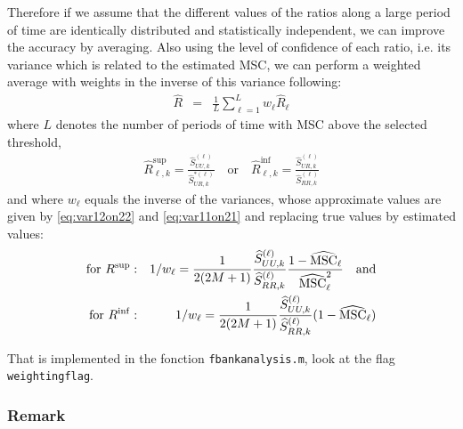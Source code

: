 Therefore if we assume that the different values of the ratios along a large period of time are identically distributed and statistically independent, we can improve the accuracy by averaging. Also using the level of confidence of each ratio, i.e. its variance which is related to the  estimated MSC, we can perform a weighted average with weights in the inverse of this variance following:
\begin{eqnarray}
\label{eq:weithted-average-Ratio}
 \hat R &=& \frac{1}{L}\sum_{\ell=1}^{L}w_{\ell}\hat R_{\ell}
\end{eqnarray}
where $L$ denotes the number of periods of time with MSC above the selected threshold,
\begin{eqnarray}
\label{eq:estimated-Ratio}
\hat R_{\ell,k} ^{\sup}=\frac{\hat S_{UU,k}^{(\ell)}}{\hat S^{*(\ell)}_{UR,k}}
\quad
\mathrm{or}
\quad
\hat R_{\ell,k}^{\inf} =\frac{\hat S_{UR,k}^{(\ell)}}{\hat S_{RR,k}^{(\ell)}}
\end{eqnarray}
and where $w_{\ell}$ equals the inverse of the variances, whose approximate values are given by \eqref{eq:var12on22} and \eqref{eq:var11on21} and replacing true values by estimated values:
\begin{eqnarray}
\label{eq:weights}
\mathrm{for}\,\, R^{\sup}:  &&1/w_{\ell}=\frac{1}{2(2M+1)}
 \frac{\widehat S_{UU,k}^{(\ell)}}{\widehat S_{RR,k}^{(\ell)}} 
  \frac{1-\widehat{\mathrm{MSC}}_{\ell}}{\widehat{\mathrm{MSC}}_{\ell}^{2}}
\quad\mathrm{and}\\
\mathrm{for }\,\, R^{\inf}:  && 1/w_{\ell}= \frac{1}{2(2M+1)}
   \frac{\widehat S_{UU,k}^{(\ell)}}{\widehat S_{RR,k}^{(\ell)}} (1-\widehat{\mathrm{MSC}}_{\ell})
\end{eqnarray}

That is implemented in the fonction {\tt fbankanalysis.m}, look at the flag {\tt weightingflag}.

\subsubsection{Remark}

